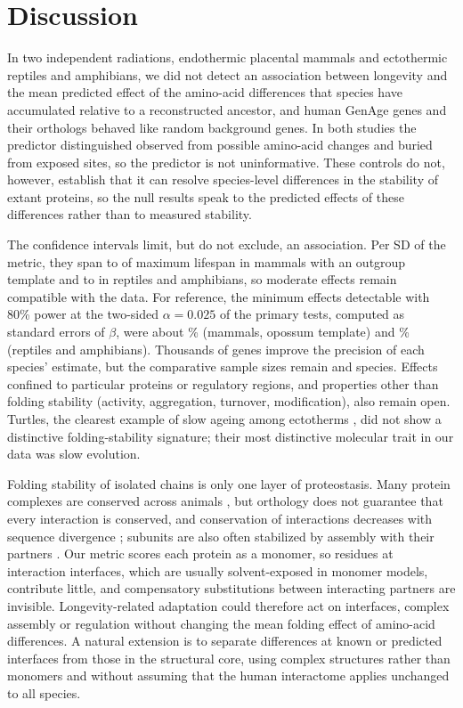 \documentclass[11pt]{article}
\begin{document}
\FloatBarrier
\section{Discussion}
In two independent radiations, endothermic placental mammals and ectothermic reptiles and amphibians, we did not detect an association between longevity and the mean predicted effect of the amino-acid differences that species have accumulated relative to a reconstructed ancestor, and human GenAge genes and their orthologs behaved like random background genes. In both studies the predictor distinguished observed from possible amino-acid changes and buried from exposed sites, so the predictor is not uninformative. These controls do not, however, establish that it can resolve species-level differences in the stability of extant proteins, so the null results speak to the predicted effects of these differences rather than to measured stability.

The confidence intervals limit, but do not exclude, an association. Per SD of the metric, they span \MPlatypusPctLo{} to \MPlatypusPctHi{} of maximum lifespan in mammals with an outgroup template and \RPrimaryPctLo{} to \RPrimaryPctHi{} in reptiles and amphibians, so moderate effects remain compatible with the data. For reference, the minimum effects detectable with 80\% power at the two-sided $\alpha = 0.025$ of the primary tests, computed as \PowerZ{} standard errors of $\beta$, were about \MOpDetectA\% (mammals, opossum template) and \RDetectA\% (reptiles and amphibians). Thousands of genes improve the precision of each species' estimate, but the comparative sample sizes remain \MNSpecies{} and \RNSpecies{} species. Effects confined to particular proteins or regulatory regions, and properties other than folding stability (activity, aggregation, turnover, modification), also remain open. Turtles, the clearest example of slow ageing among ectotherms \citep{daSilva2022}, did not show a distinctive folding-stability signature; their most distinctive molecular trait in our data was slow evolution.

Folding stability of isolated chains is only one layer of proteostasis. Many protein complexes are conserved across animals \citep{Wan2015}, but orthology does not guarantee that every interaction is conserved, and conservation of interactions decreases with sequence divergence \citep{Lewis2012}; subunits are also often stabilized by assembly with their partners \citep{Yeh2024}. Our metric scores each protein as a monomer, so residues at interaction interfaces, which are usually solvent-exposed in monomer models, contribute little, and compensatory substitutions between interacting partners are invisible. Longevity-related adaptation could therefore act on interfaces, complex assembly or regulation without changing the mean folding effect of amino-acid differences. A natural extension is to separate differences at known or predicted interfaces from those in the structural core, using complex structures rather than monomers and without assuming that the human interactome applies unchanged to all species.
\end{document}
